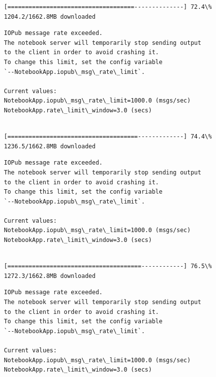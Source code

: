 \documentclass[11pt]{article}
\begin{document}
    \begin{Verbatim}[commandchars=\\\{\}]
[====================================--------------] 72.4\% 1204.2/1662.8MB downloaded
    \end{Verbatim}

    \begin{Verbatim}[commandchars=\\\{\}]
IOPub message rate exceeded.
The notebook server will temporarily stop sending output
to the client in order to avoid crashing it.
To change this limit, set the config variable
`--NotebookApp.iopub\_msg\_rate\_limit`.

Current values:
NotebookApp.iopub\_msg\_rate\_limit=1000.0 (msgs/sec)
NotebookApp.rate\_limit\_window=3.0 (secs)


    \end{Verbatim}

    \begin{Verbatim}[commandchars=\\\{\}]
[=====================================-------------] 74.4\% 1236.5/1662.8MB downloaded
    \end{Verbatim}

    \begin{Verbatim}[commandchars=\\\{\}]
IOPub message rate exceeded.
The notebook server will temporarily stop sending output
to the client in order to avoid crashing it.
To change this limit, set the config variable
`--NotebookApp.iopub\_msg\_rate\_limit`.

Current values:
NotebookApp.iopub\_msg\_rate\_limit=1000.0 (msgs/sec)
NotebookApp.rate\_limit\_window=3.0 (secs)


    \end{Verbatim}

    \begin{Verbatim}[commandchars=\\\{\}]
[======================================------------] 76.5\% 1272.3/1662.8MB downloaded
    \end{Verbatim}

    \begin{Verbatim}[commandchars=\\\{\}]
IOPub message rate exceeded.
The notebook server will temporarily stop sending output
to the client in order to avoid crashing it.
To change this limit, set the config variable
`--NotebookApp.iopub\_msg\_rate\_limit`.

Current values:
NotebookApp.iopub\_msg\_rate\_limit=1000.0 (msgs/sec)
NotebookApp.rate\_limit\_window=3.0 (secs)


    \end{Verbatim}
\end{document}
